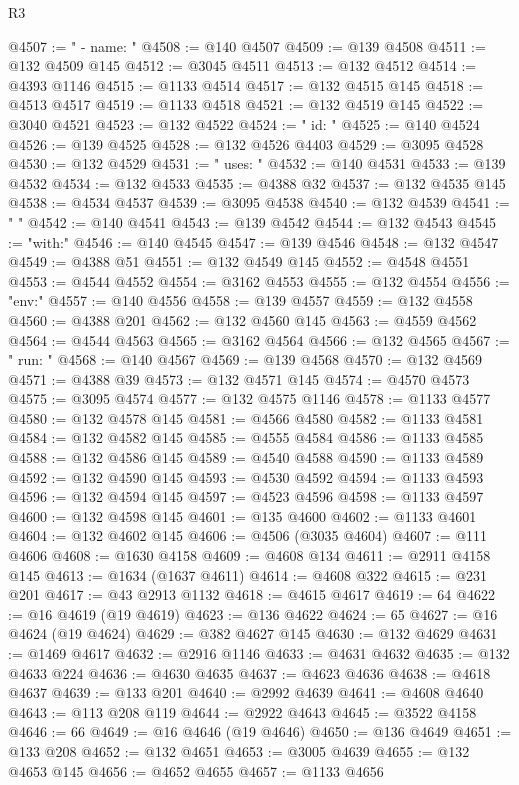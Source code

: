 \begin{lexlean}{R3}
\begin{coremodule}
@4507 := "      - name: "
@4508 := @140 @4507
@4509 := @139 @4508
@4511 := @132 @4509 @145
@4512 := @3045 @4511
@4513 := @132 @4512
@4514 := @4393 @1146
@4515 := @1133 @4514
@4517 := @132 @4515 @145
@4518 := @4513 @4517
@4519 := @1133 @4518
@4521 := @132 @4519 @145
@4522 := @3040 @4521
@4523 := @132 @4522
@4524 := "        id: "
@4525 := @140 @4524
@4526 := @139 @4525
@4528 := @132 @4526 @4403
@4529 := @3095 @4528
@4530 := @132 @4529
@4531 := "        uses: "
@4532 := @140 @4531
@4533 := @139 @4532
@4534 := @132 @4533
@4535 := @4388 @32
@4537 := @132 @4535 @145
@4538 := @4534 @4537
@4539 := @3095 @4538
@4540 := @132 @4539
@4541 := "        "
@4542 := @140 @4541
@4543 := @139 @4542
@4544 := @132 @4543
@4545 := "with:"
@4546 := @140 @4545
@4547 := @139 @4546
@4548 := @132 @4547
@4549 := @4388 @51
@4551 := @132 @4549 @145
@4552 := @4548 @4551
@4553 := @4544 @4552
@4554 := @3162 @4553
@4555 := @132 @4554
@4556 := "env:"
@4557 := @140 @4556
@4558 := @139 @4557
@4559 := @132 @4558
@4560 := @4388 @201
@4562 := @132 @4560 @145
@4563 := @4559 @4562
@4564 := @4544 @4563
@4565 := @3162 @4564
@4566 := @132 @4565
@4567 := "        run: "
@4568 := @140 @4567
@4569 := @139 @4568
@4570 := @132 @4569
@4571 := @4388 @39
@4573 := @132 @4571 @145
@4574 := @4570 @4573
@4575 := @3095 @4574
@4577 := @132 @4575 @1146
@4578 := @1133 @4577
@4580 := @132 @4578 @145
@4581 := @4566 @4580
@4582 := @1133 @4581
@4584 := @132 @4582 @145
@4585 := @4555 @4584
@4586 := @1133 @4585
@4588 := @132 @4586 @145
@4589 := @4540 @4588
@4590 := @1133 @4589
@4592 := @132 @4590 @145
@4593 := @4530 @4592
@4594 := @1133 @4593
@4596 := @132 @4594 @145
@4597 := @4523 @4596
@4598 := @1133 @4597
@4600 := @132 @4598 @145
@4601 := @135 @4600
@4602 := @1133 @4601
@4604 := @132 @4602 @145
@4606 := @4506 (@3035 @4604)
@4607 := @111 @4606
@4608 := @1630 @4158
@4609 := @4608 @134
@4611 := @2911 @4158 @145
@4613 := @1634 (@1637 @4611)
@4614 := @4608 @322
@4615 := @231 @201
@4617 := @43 @2913 @1132
@4618 := @4615 @4617
@4619 := 64
@4622 := @16 @4619 (@19 @4619)
@4623 := @136 @4622
@4624 := 65
@4627 := @16 @4624 (@19 @4624)
@4629 := @382 @4627 @145
@4630 := @132 @4629
@4631 := @1469 @4617
@4632 := @2916 @1146
@4633 := @4631 @4632
@4635 := @132 @4633 @224
@4636 := @4630 @4635
@4637 := @4623 @4636
@4638 := @4618 @4637
@4639 := @133 @201
@4640 := @2992 @4639
@4641 := @4608 @4640
@4643 := @113 @208 @119
@4644 := @2922 @4643
@4645 := @3522 @4158
@4646 := 66
@4649 := @16 @4646 (@19 @4646)
@4650 := @136 @4649
@4651 := @133 @208
@4652 := @132 @4651
@4653 := @3005 @4639
@4655 := @132 @4653 @145
@4656 := @4652 @4655
@4657 := @1133 @4656

\end{coremodule}
\end{lexlean}
